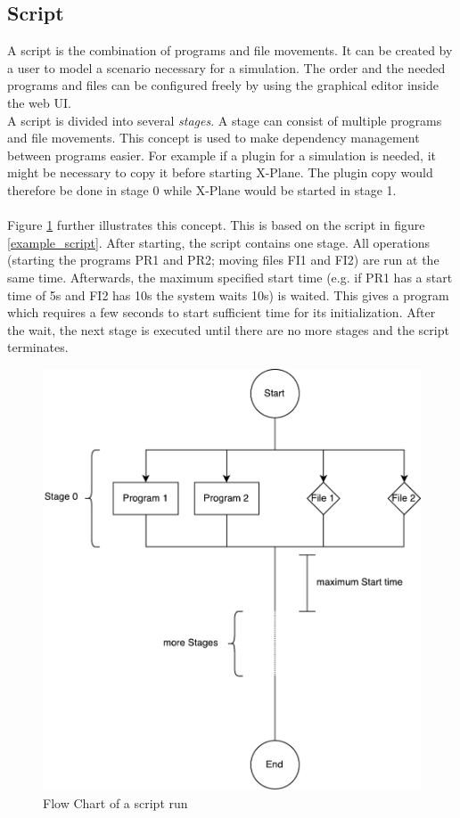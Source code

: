 \documentclass[accentcolor=tud1a, paper=a4, colorback]{tudreport}
\newcommand{\ind}[1]{#1\index{#1}}
\begin{document}
	\subsection{\ind{Script}}\label{script}
	A script is the combination of programs and file movements. It can be created by a user to model
	a scenario necessary for a simulation. The order and the needed programs and files can be configured
	freely by using the graphical editor inside the web UI.
	\\
	A script is divided into several \textit{\ind{stages}}. A stage can consist of multiple programs
	and file movements. This concept is used to make dependency management between programs easier.
	For example if  a plugin for a simulation is needed, it might be necessary to copy it before starting
	X-Plane. The plugin copy would therefore be done in stage 0 while X-Plane would be started in stage 1.
	\\\\
	Figure \ref{schedule} further illustrates this concept. This is based on the script in figure \ref{example_script}.
	After starting, the script contains one stage. All operations (starting the programs PR1 and PR2; moving files FI1 and FI2)
	are run at the same time. Afterwards, the maximum specified start time (e.g. if PR1 has a start time of 5s and FI2 has
	10s the system waits 10s) is waited. This gives a program which requires a few seconds to start sufficient time for its
	initialization.
	After the wait, the next stage is executed until there are no more stages and the script terminates.

	\begin{figure}[H]
		\centering
		\includegraphics[width=.7\textwidth]{schedule}
		\caption{Flow Chart of a script run}
		\label{schedule}
	\end{figure}
\end{document}
